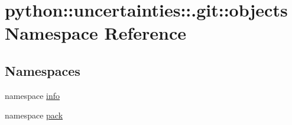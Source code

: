 \hypertarget{namespacepython_1_1uncertainties_1_1_8git_1_1objects}{
\section{python::uncertainties::.git::objects Namespace Reference}
\label{namespacepython_1_1uncertainties_1_1_8git_1_1objects}
}
\subsection*{Namespaces}
\begin{DoxyCompactItemize}
\item 
namespace \hyperlink{namespacepython_1_1uncertainties_1_1_8git_1_1objects_1_1info}{info}
\item 
namespace \hyperlink{namespacepython_1_1uncertainties_1_1_8git_1_1objects_1_1pack}{pack}
\end{DoxyCompactItemize}
